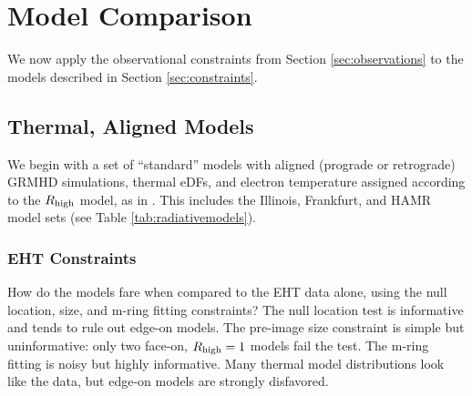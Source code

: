\section{Model Comparison}\label{sec:comparisons}

We now apply the observational constraints from Section \ref{sec:observations} to the models described in Section \ref{sec:constraints}.

\subsection{Thermal, Aligned Models}

We begin with a set of ``standard'' models with aligned (prograde or retrograde) GRMHD simulations, thermal eDFs, and electron temperature assigned according to the $R_\mathrm{high}$ model, as in .  This includes the Illinois, Frankfurt, and HAMR model sets (see Table \ref{tab:radiativemodels}).

\subsubsection{EHT Constraints}

How do the models fare when compared to the EHT data alone, using the null location, size, and m-ring fitting constraints?  The null location test is informative and tends to rule out edge-on models.  The pre-image size constraint is simple but uninformative: only two face-on, $R_\mathrm{high} = 1$ models fail the test.   The m-ring fitting is noisy but highly informative.  Many thermal model distributions look like the data, but edge-on models are strongly disfavored.




